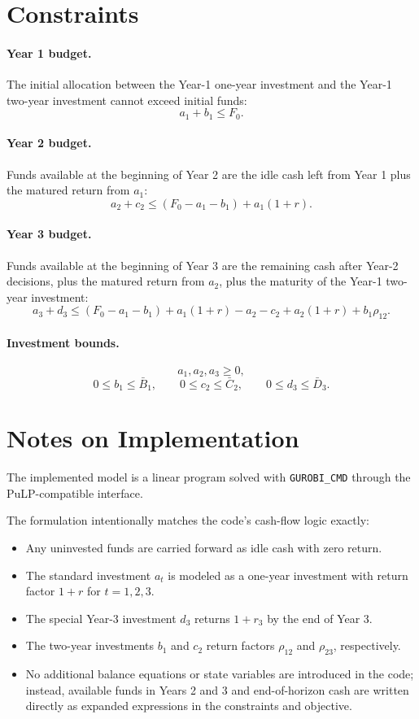 \section*{Constraints}

\paragraph{Year 1 budget.}
The initial allocation between the Year-1 one-year investment and the Year-1 two-year investment cannot exceed initial funds:
\[
a_1 + b_1 \le F_0.
\]

\paragraph{Year 2 budget.}
Funds available at the beginning of Year 2 are the idle cash left from Year 1 plus the matured return from \(a_1\):
\[
a_2 + c_2 \le (F_0-a_1-b_1)+a_1(1+r).
\]

\paragraph{Year 3 budget.}
Funds available at the beginning of Year 3 are the remaining cash after Year-2 decisions, plus the matured return from \(a_2\), plus the maturity of the Year-1 two-year investment:
\[
a_3 + d_3
\le
(F_0-a_1-b_1)+a_1(1+r)-a_2-c_2+a_2(1+r)+b_1\rho_{12}.
\]

\paragraph{Investment bounds.}
\[
a_1,a_2,a_3 \ge 0,
\]
\[
0 \le b_1 \le \bar B_1,
\qquad
0 \le c_2 \le \bar C_2,
\qquad
0 \le d_3 \le \bar D_3.
\]

\section*{Notes on Implementation}

The implemented model is a linear program solved with \texttt{GUROBI\_CMD} through the PuLP-compatible interface.

The formulation intentionally matches the code's cash-flow logic exactly:
\begin{itemize}
    \item Any uninvested funds are carried forward as idle cash with zero return.
    \item The standard investment \(a_t\) is modeled as a one-year investment with return factor \(1+r\) for \(t=1,2,3\).
    \item The special Year-3 investment \(d_3\) returns \(1+r_3\) by the end of Year 3.
    \item The two-year investments \(b_1\) and \(c_2\) return factors \(\rho_{12}\) and \(\rho_{23}\), respectively.
    \item No additional balance equations or state variables are introduced in the code; instead, available funds in Years 2 and 3 and end-of-horizon cash are written directly as expanded expressions in the constraints and objective.
\end{itemize}
